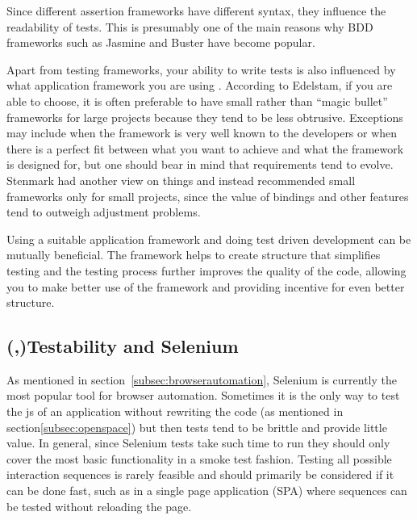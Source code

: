 \documentclass[11pt]{article}
\begin{document}
Since different assertion frameworks have different syntax, they influence the readability of tests. This is presumably one of the main reasons why BDD frameworks such as Jasmine and Buster have become popular. \cite[question~7]{Ahnve}

Apart from testing frameworks, your ability to write tests is also influenced by what application framework you are using \cite[question~8]{Ahnve}. According to Edelstam, if you are able to choose, it is often preferable to have small rather than ``magic bullet'' frameworks for large projects because they tend to be less obtrusive. Exceptions may include when the framework is very well known to the developers or when there is a perfect fit between what you want to achieve and what the framework is designed for, but one should bear in mind that requirements tend to evolve. \cite[questions~48-50]{Edelstam} Stenmark had another view on things and instead recommended small frameworks only for small projects, since the value of bindings and other features tend to outweigh adjustment problems. \cite[questions~12-14]{Stenmark}

Using a suitable application framework and doing test driven development can be mutually beneficial. The framework helps to create structure that simplifies testing and the testing process further improves the quality of the code, allowing you to make better use of the framework and providing incentive for even better structure. \cite[question~15]{Stenmark}

\subsection{(,)Testability and Selenium}

As mentioned in section~\ref{subsec:browserautomation}, Selenium is currently the most popular tool for browser automation. Sometimes it is the only way to test the \gls{js} of an application without rewriting the code\cite[question~43]{Stenmark} (as mentioned in section\ref{subsec:openspace}) but then tests tend to be brittle and provide little value. In general, since Selenium tests take such time to run they should only cover the most basic functionality in a smoke test fashion. \cite[questions~16-17]{Stenmark}\cite[question~21]{Ahnve} Testing all possible interaction sequences is rarely feasible and should primarily be considered if it can be done fast, such as in a single page application (SPA) where sequences can be tested without reloading the page. \cite[question~44]{Edelstam}
\end{document}
